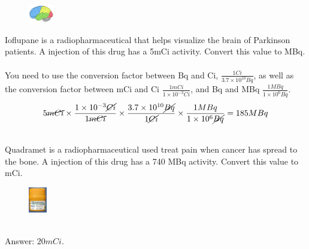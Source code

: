 \documentclass[main.tex]{subfiles}
\begin{document}
\begin{description}
\begin{example} %
\begin{figure}
    \centering
    \includegraphics[width=0.1\textwidth]{./../Ch-nuclear/figure3}
\end{figure}
Ioflupane is a radiopharmaceutical that helps visualize the brain of Parkinson patients. A injection of this drug has a 5mCi activity. Convert this value to MBq.
\\
\\
You need to use the conversion factor between Bq and Ci, $ \frac{1 Ci}{3.7 \times10^{10} Bq} $, as well as the conversion factor between mCi and Ci $ \frac{1 mCi}{1 \times10^{-3} Ci} $, and Bq and MBq $ \frac{1 MBq}{1 \times10^{6} Bq} $.
 \begin{equation*}
5\cancel{mCi} \times \dfrac{1 \times10^{-3}\cancel{Ci}}{1\cancel{mCi}} \times \dfrac{3.7 \times10^{10}\cancel{Bq}}{1\cancel{Ci}}  \times \dfrac{1MBq}{1 \times10^{6}\cancel{Bq}}  =185 MBq
\end{equation*}


\faDiamond\ \\

Quadramet is a radiopharmaceutical used treat pain when cancer has spread to the bone. A injection of this drug has a 740 MBq activity. Convert this value to mCi.
\begin{figure}
    \centering\includegraphics[width=0.07\textwidth]{./../Ch-nuclear/figure4}
\end{figure} \\
\flushright Answer: $20mCi$.
\end{example}%
\end{description}
\end{document}
